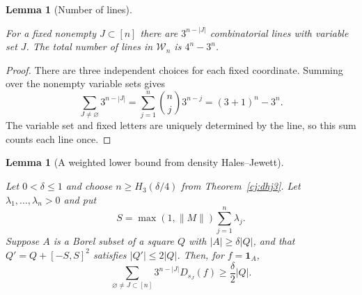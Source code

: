 \documentclass[11pt]{amsart}
\newcommand{\one}{\mathbf 1}
\newtheorem{lemma}[theorem]{Lemma}
\theoremstyle{definition}
\theoremstyle{remark}
\numberwithin{equation}{section}
\providecommand{\lean}[1]{}
\providecommand{\leanok}{}
\begin{document}
\begin{lemma}[Number of lines]\label{den:line-number}
\lean{Auto.den_line_number_fixed,Auto.den_line_number}
\leanok
For a fixed nonempty $J\subset[n]$ there are $3^{n-|J|}$
combinatorial lines with variable set $J$.  The total number
of lines in $\mathcal W_n$ is $4^n-3^n$.
\end{lemma}
\begin{proof}
There are three independent choices for each fixed coordinate.
Summing over the nonempty variable sets gives
\[
 \sum_{J\ne\varnothing}3^{n-|J|}
   =\sum_{j=1}^n\binom nj3^{n-j}=(3+1)^n-3^n.
\]
The variable set and fixed letters are uniquely determined by
the line, so this sum counts each line once.
\end{proof}

\begin{lemma}[A weighted lower bound from density Hales--Jewett]
\label{den:weighted-lower}
\lean{Auto.den_weighted_lower}
\leanok
Let $0<\delta\le1$ and choose
$n\ge H_3(\delta/4)$ from Theorem~\ref{cj:dhj3}.
Let $\lambda_1,\ldots,\lambda_n>0$ and put
\[
 S=\max(1,\|M\|)\sum_{j=1}^n\lambda_j.
\]
Suppose $A$ is a Borel subset of a square $Q$ with
$|A|\ge\delta|Q|$, and that
$Q'=Q+[-S,S]^2$ satisfies $|Q'|\le2|Q|$.
Then, for $f=\one_A$,
\begin{equation}\label{den:lower-bound}
 \sum_{\varnothing\ne J\subset[n]}3^{n-|J|}D_{s_J}(f)
       \ge\frac{\delta}{2}|Q|.
\end{equation}
\end{lemma}
\end{document}
